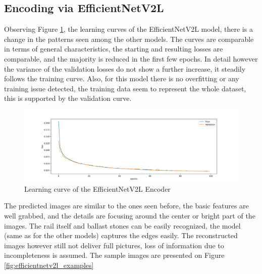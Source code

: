 \subsection{Encoding via EfficientNetV2L}
Observing Figure \ref{fig:efficientnetv2l_learning_curve}, the learning curves of the
EfficientNetV2L model, there is a change in the patterns seen among the other models.
The curves are comparable in terms of general characteristics, the starting and resulting losses are
comparable, and the majority is reduced in the first few epochs.
In detail however the variance of the validation losses do not show a further increase,
it steadily follows the training curve.
Also, for this model there is no overfitting or any training issue detected, the training data
seem to represent the whole dataset, this is supported by the validation curve.

\begin{figure}[!ht]
    \centering
    \includegraphics[width=\textwidth,trim={0 0 0 1cm},clip]{./results/efficientnetv2l_vgg19/20230525_194238_results.png}
    \caption{Learning curve of the EfficientNetV2L Encoder}
    \label{fig:efficientnetv2l_learning_curve}
\end{figure}

The predicted images are similar to the ones seen before, the basic features are well grabbed, and
the details are focusing around the center or bright part of the images.
The rail itself and ballast stones can be easily recognized, the model (same as for the other models)
captures the edges easily.
The reconstructed images however still not deliver full pictures, loss of information due to
incompleteness is assumed.
The sample images are presented on Figure \ref{fig:efficientnetv2l_examples}

